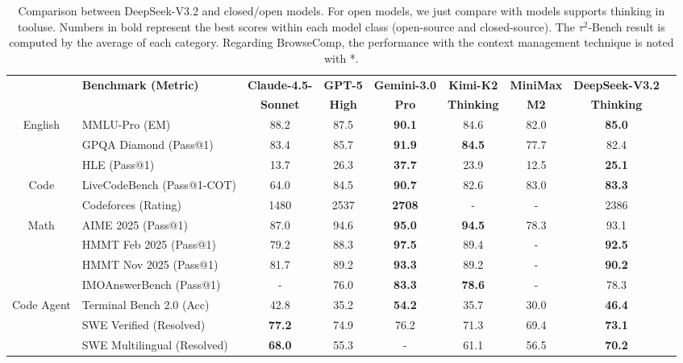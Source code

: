 \documentclass[11pt, a4paper, logo, copyright, nonumbering]{deepseek}
\def\newmodel{DeepSeek-V3.2}
\begin{document}
\begin{CJK*}{UTF8}{gbsn}
\begin{table}[htbp]
    \centering
    \footnotesize
    \setlength{\tabcolsep}{1.9pt}
    \caption{ Comparison between \newmodel{} and closed/open models. For open models, we just compare with models supports thinking in tooluse. 
    Numbers in bold represent the best scores within each model class (open-source and closed-source).  The $\tau^2$-Bench result is computed by the average of each category. Regarding BrowseComp, the performance with the context management technique is noted with *.
      }
    \begin{tabular}{@{}c l | c  c  c | c c c c @{}}
    \toprule
    & \multirow{2}{*}{\centering \textbf{Benchmark {\tiny (Metric)}}}  & \textbf{Claude-4.5-}  & \textbf{GPT-5}& \textbf{Gemini-3.0} & \textbf{Kimi-K2} & \textbf{MiniMax} & \textbf{\newmodel} \\
    & & \textbf{Sonnet}  & \textbf{High} & \textbf{Pro} & \textbf{Thinking}& \textbf{M2} &\textbf{Thinking} \\

    \midrule
    \multirow{3}{*}{English}
    & MMLU-Pro {\tiny (EM)} & 88.2 & 87.5 & \textbf{90.1} & 84.6 & 82.0 & \textbf{85.0}\\

    & GPQA Diamond {\tiny (Pass@1)} &83.4 & 85.7& \textbf{91.9} & \textbf{84.5} & 77.7 &82.4\\
    & HLE {\tiny (Pass@1)} &13.7 & 26.3 & \textbf{37.7} & 23.9 & 12.5 & \textbf {25.1}\\
    \midrule
    \multirow{2}{*}{Code} & LiveCodeBench {\tiny (Pass@1-COT)}  & 64.0& 84.5& \textbf{90.7}& 82.6& 83.0&   \textbf{83.3} \\
    & Codeforces {\tiny (Rating)} & 1480 &2537& \textbf{2708}& -& -&2386 \\
    \midrule
        \multirow{4}{*}{Math} & AIME 2025 {\tiny (Pass@1)}  & 87.0 & 94.6 & \textbf{95.0} & \textbf{94.5} & 78.3 & 93.1 \\
    & HMMT Feb 2025 {\tiny (Pass@1)}  & 79.2 & 88.3 & \textbf{97.5} & 89.4 & - &\textbf{92.5} \\
    & HMMT Nov 2025 {\tiny (Pass@1)}  & 81.7 & 89.2 & \textbf{93.3} & 89.2 & - &  \textbf{90.2}\\
    & IMOAnswerBench {\tiny (Pass@1)}  & - & 76.0 & \textbf{83.3} & \textbf{78.6} & -  &78.3  \\
    \midrule
     \multirow{3}{*}{Code Agent} & Terminal Bench 2.0 {\tiny (Acc)}  &42.8& 35.2& \textbf{54.2} & 35.7& 30.0 & \textbf{46.4}\\
      & SWE Verified {\tiny (Resolved)}  & \textbf{77.2} & 74.9&76.2 & 71.3& 69.4 &  \textbf{73.1}\\
      & SWE Multilingual {\tiny (Resolved)}  &\textbf{68.0} &55.3 &- & 61.1 & 56.5	 & \textbf{70.2}\\  \midrule


\end{tabular}
\end{table}
\end{CJK*}
\end{document}
